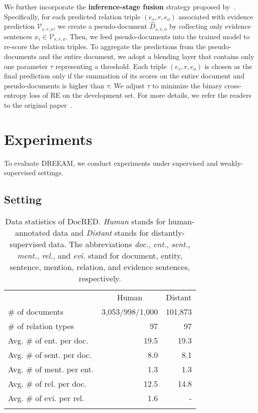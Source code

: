 \documentclass[11pt]{article}
\newcommand{\setV}{\mathcal{V}}
\begin{document}
We further incorporate the \textbf{inference-stage fusion} strategy proposed by~\citet{xie-etal-2022-eider}. 
Specifically, for each predicted relation triple $(e_s, r, e_o)$ associated with evidence prediction $\setV_{s,r,o}$, we create a pseudo-document $\hat{D}_{s,r,o}$ by collecting only evidence sentences $x_i \in \setV_{s,r,o}$.
Then, we feed pseudo-documents into the trained model to re-score the relation triples.
To aggregate the predictions from the pseudo-documents and the entire document, we adopt a blending layer that contains only one parameter $\tau$ representing a threshold.
Each triple $(e_s, r, e_o)$ is chosen as the final prediction only if the summation of its scores on the entire document and pseudo-documents is higher than $\tau$. 
We adjust $\tau$ to minimize the binary cross-entropy loss of RE on the development set.
For more details, we refer the readers to the original paper~\cite{xie-etal-2022-eider}.

\section{Experiments}

To evaluate DREEAM, we conduct experiments under supervised and weakly-supervised settings.
\subsection{Setting}

\begin{table}[t]
    \centering
    \small
    \begin{tabular}{l|rr}
    \Xhline{3\arrayrulewidth}
         \multicolumn{1}{c|}{\textbf{Statistics}} & \multicolumn{1}{c}{Human} & \multicolumn{1}{c}{Distant} \\
         \Xhline{2\arrayrulewidth}
         \# of documents & 3,053/998/1,000 & 101,873\\
         \# of relation types & 97 & 97 \\
         Avg. \# of ent. per doc. & 19.5 & 19.3 \\
         Avg. \# of sent. per doc. & 8.0 & 8.1\\
         Avg. \# of ment. per ent. & 1.3 & 1.3 \\
         Avg. \# of rel. per doc. & 12.5 & 14.8 \\
         Avg. \# of evi. per rel. & 1.6 & -\\
    \Xhline{3\arrayrulewidth}
    \end{tabular}
    \caption{Data statistics of DocRED. \textit{Human} stands for human-annotated data and \textit{Distant} stands for distantly-supervised data. The abbreviations \textit{doc.}, \textit{ent.}, \textit{sent.}, \textit{ment.}, \textit{rel.}, and \textit{evi.} stand for document, entity, sentence, mention, relation, and evidence sentences, respectively.}
    \label{tab:dataset}
\end{table}
\end{document}
